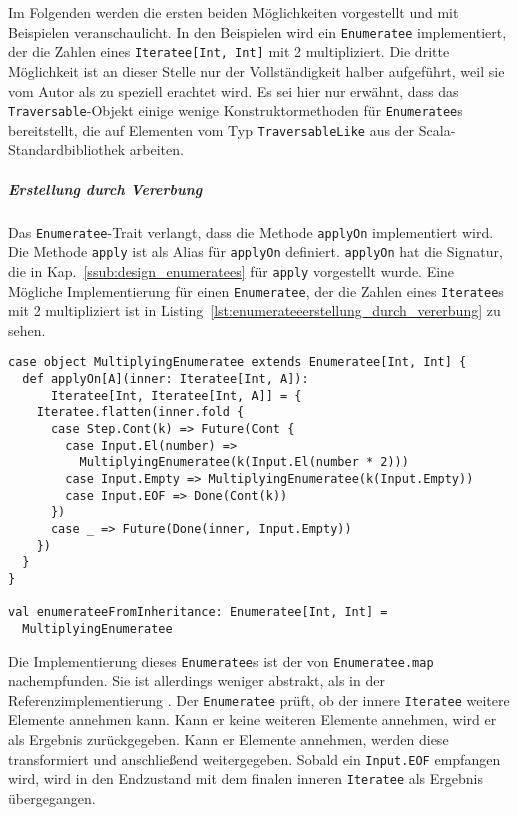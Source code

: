 \documentclass[draft=false
              ,paper=a4
              ,twoside=false
              ,fontsize=11pt
              ,headsepline
              ,BCOR10mm
              ,DIV11
              ]{scrbook}
\begin{document}
Im Folgenden werden die ersten beiden Möglichkeiten vorgestellt und mit Beispielen veranschaulicht.
In den Beispielen wird ein \lstinline|Enumeratee| implementiert, der die Zahlen eines \lstinline|Iteratee[Int, Int]| mit 2 multipliziert.
Die dritte Möglichkeit ist an dieser Stelle nur der Vollständigkeit halber aufgeführt, weil sie vom Autor als zu speziell erachtet wird.
Es sei hier nur erwähnt, dass das \lstinline|Traversable|-Objekt einige wenige Konstruktormethoden für \lstinline|Enumeratee|s bereitstellt, die auf Elementen vom Typ \lstinline|TraversableLike| aus der Scala-Standardbibliothek arbeiten.

\subparagraph{Erstellung durch Vererbung} %
\label{subp:enumerateeerstellung_durch_vererbung}\mbox{} %

Das \lstinline|Enumeratee|-Trait verlangt, dass die Methode \lstinline|applyOn| implementiert wird.
Die Methode \lstinline|apply| ist als Alias für \lstinline|applyOn| definiert.
\lstinline|applyOn| hat die Signatur, die in Kap.~\ref{ssub:design_enumeratees} für \lstinline|apply| vorgestellt wurde.
Eine Mögliche Implementierung für einen \lstinline|Enumeratee|, der die Zahlen eines \lstinline|Iteratee|s mit 2 multipliziert ist in Listing~\ref{lst:enumerateeerstellung_durch_vererbung} zu sehen.

\begin{lstlisting}[caption=Erstellung eines Enumeratees durch Vererbung, label=lst:enumerateeerstellung_durch_vererbung]
case object MultiplyingEnumeratee extends Enumeratee[Int, Int] {
  def applyOn[A](inner: Iteratee[Int, A]):
      Iteratee[Int, Iteratee[Int, A]] = {
    Iteratee.flatten(inner.fold {
      case Step.Cont(k) => Future(Cont {
        case Input.El(number) =>
          MultiplyingEnumeratee(k(Input.El(number * 2)))
        case Input.Empty => MultiplyingEnumeratee(k(Input.Empty))
        case Input.EOF => Done(Cont(k))
      })
      case _ => Future(Done(inner, Input.Empty))
    })
  }
}

val enumerateeFromInheritance: Enumeratee[Int, Int] =
  MultiplyingEnumeratee
\end{lstlisting}

Die Implementierung dieses \lstinline|Enumeratee|s ist der von \lstinline|Enumeratee.map| nachempfunden.
Sie ist allerdings weniger abstrakt, als in der Referenzimplementierung \cite[vgl.][Zeile~268, 174, 81]{play_enumeratee_source_code}.
Der \lstinline|Enumeratee| prüft, ob der innere \lstinline|Iteratee| weitere Elemente annehmen kann.
Kann er keine weiteren Elemente annehmen, wird er als Ergebnis zurückgegeben.
Kann er Elemente annehmen, werden diese transformiert und anschließend weitergegeben.
Sobald ein \lstinline|Input.EOF| empfangen wird, wird in den Endzustand mit dem finalen inneren \lstinline|Iteratee| als Ergebnis übergegangen.
\end{document}
